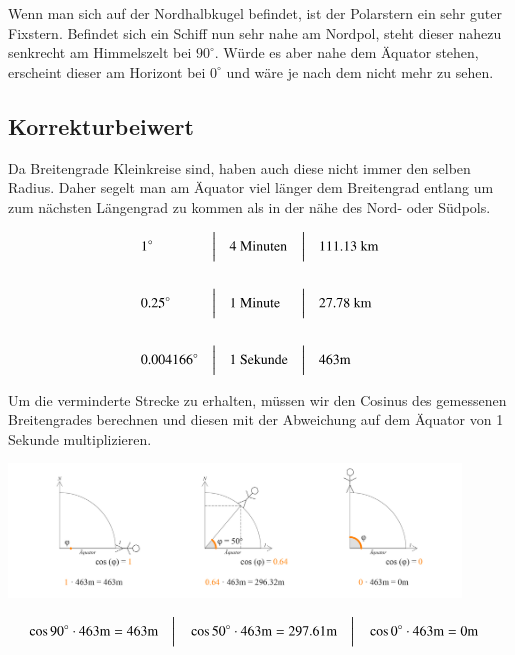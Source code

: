 \begin{refsection}
Wenn man sich auf der Nordhalbkugel befindet, ist der Polarstern ein sehr guter Fixstern. Befindet sich ein Schiff nun sehr nahe am Nordpol, steht dieser nahezu senkrecht am Himmelszelt bei $90^{\circ}$. Würde es aber nahe dem Äquator stehen, erscheint dieser am Horizont bei $0^{\circ}$ und wäre je nach dem nicht mehr zu sehen.


\subsection{Korrekturbeiwert}
Da Breitengrade Kleinkreise sind, haben auch diese nicht immer den selben Radius. Daher segelt man am Äquator viel länger dem Breitengrad entlang um zum nächsten Längengrad zu kommen als in der nähe des Nord- oder Südpols.

\[
\begin{aligned}
&\text{1}^{\circ}
&
&\text{\bigg \vert}
&
&\text{4 Minuten}
&
&\text{\bigg \vert}
&
&\text{111.13 km}
\\
\\
&\text{0.25}^{\circ}
&
&\text{\bigg \vert}
&
&\text{1 Minute}
&
&\text{\bigg \vert}
&
&\text{27.78 km}
\\
\\
&\text{0.004166}^{\circ}
&
&\text{\bigg \vert}
&
&\text{1 Sekunde}
&
&\text{\bigg \vert}
&
&\text{463m}
\end{aligned}
\]

Um die verminderte Strecke zu erhalten, müssen wir den Cosinus des gemessenen Breitengrades berechnen und diesen mit der Abweichung auf dem Äquator von 1 Sekunde multiplizieren.

\begin{center}
        \includegraphics[width=0.9\textwidth]{kugel/Korrekturbeiwert.jpg}
\end{center}

\[
\begin{aligned}
&\cos 90^\circ \cdot 463\text{m} = 463\text{m}
&
&\text{\bigg \vert}
&
&\cos 50^\circ \cdot 463\text{m} = 297.61\text{m}
&
&\text{\bigg \vert}
&
&\cos 0^\circ \cdot 463\text{m} = 0\text{m}
\end{aligned}
\]


\end{refsection}
